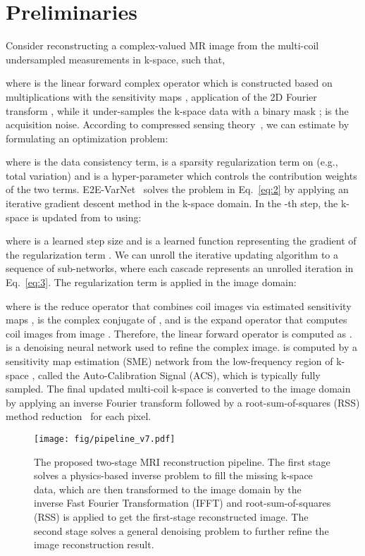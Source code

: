 \documentclass[runningheads]{llncs}
\begin{document}
 


\section{Preliminaries}
Consider  reconstructing a complex-valued MR image  from the multi-coil undersampled measurements  in k-space, such that,

where  is the linear forward complex operator which is constructed based on multiplications with the sensitivity maps , application of the 2D Fourier transform , while it under-samples the k-space data with a binary mask ;  is the acquisition noise. 
According to compressed sensing theory~\cite{donoho2006compressed}, we can estimate  by formulating an optimization problem:

where  is the data consistency term,  is a sparsity regularization term on  (e.g., total variation) and  is a hyper-parameter which controls the contribution weights of the two terms.
E2E-VarNet~\cite{sriram2020end} solves the problem in Eq.~\ref{eq:2} by applying an iterative gradient descent method in the k-space domain. In the -th step, the k-space is updated from  to  using:

where  is a learned step size and  is a learned function representing the gradient of the regularization term . We can unroll the iterative updating algorithm to a sequence of sub-networks, where each cascade represents an unrolled iteration in Eq.~\ref{eq:3}. 
The regularization term is applied in the image domain:

where  is the reduce operator that combines  coil images  via estimated sensitivity maps ,  is the complex conjugate of , and  is the expand operator that computes coil images from image . Therefore, the linear forward operator  is computed as .  is a denoising neural network used to refine the complex image.  is computed by a sensitivity map estimation (SME) network from the low-frequency region of k-space , called the Auto-Calibration Signal (ACS), which is typically fully sampled. The final updated multi-coil k-space is converted to the image domain by applying an inverse Fourier transform followed by a root-sum-of-squares (RSS) method reduction~\cite{roemer1990nmr} for each pixel.



 
\begin{figure*}[t!]
\centering
\texttt{[image: fig/pipeline\_v7.pdf]}
\caption{The proposed two-stage MRI reconstruction pipeline. The first stage solves a physics-based inverse problem to fill the missing k-space data, which are then transformed to the image domain by the inverse Fast Fourier Transformation (IFFT) and root-sum-of-squares (RSS) is applied to get the first-stage reconstructed image. The second stage solves a general denoising problem to further refine the image reconstruction result.}

\label{fig:pipeline}
\end{figure*}
\end{document}
